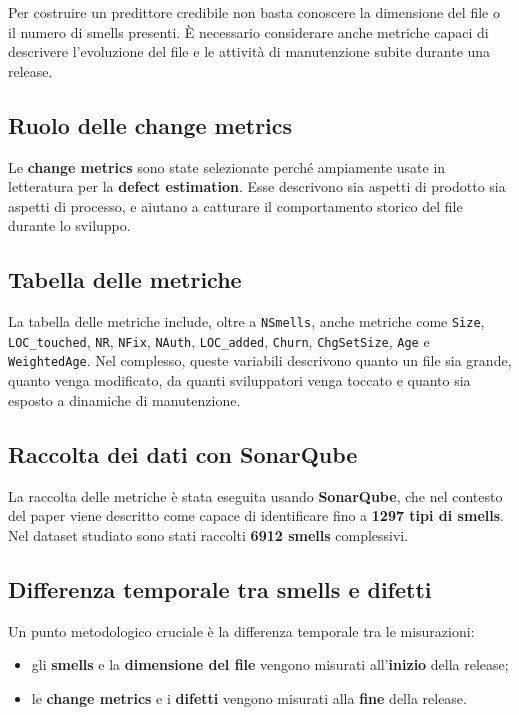 Per costruire un predittore credibile non basta conoscere la dimensione del file o il numero di smells presenti. È necessario considerare anche metriche capaci di descrivere l'evoluzione del file e le attività di manutenzione subite durante una release.

\subsection{Ruolo delle change metrics}

Le \textbf{change metrics} sono state selezionate perché ampiamente usate in letteratura per la \textbf{defect estimation}. Esse descrivono sia aspetti di prodotto sia aspetti di processo, e aiutano a catturare il comportamento storico del file durante lo sviluppo.

\subsection{Tabella delle metriche}

\begin{notaslide}
La tabella delle metriche include, oltre a \texttt{NSmells}, anche metriche come \texttt{Size}, \texttt{LOC\_touched}, \texttt{NR}, \texttt{NFix}, \texttt{NAuth}, \texttt{LOC\_added}, \texttt{Churn}, \texttt{ChgSetSize}, \texttt{Age} e \texttt{WeightedAge}. Nel complesso, queste variabili descrivono quanto un file sia grande, quanto venga modificato, da quanti sviluppatori venga toccato e quanto sia esposto a dinamiche di manutenzione.
\end{notaslide}

\subsection{Raccolta dei dati con SonarQube}

La raccolta delle metriche è stata eseguita usando \textbf{SonarQube}, che nel contesto del paper viene descritto come capace di identificare fino a \textbf{1297 tipi di smells}. Nel dataset studiato sono stati raccolti \textbf{6912 smells} complessivi.

\subsection{Differenza temporale tra smells e difetti}

Un punto metodologico cruciale è la differenza temporale tra le misurazioni:

\begin{itemize}
    \item gli \textbf{smells} e la \textbf{dimensione del file} vengono misurati all'\textbf{inizio} della release;
    \item le \textbf{change metrics} e i \textbf{difetti} vengono misurati alla \textbf{fine} della release.
\end{itemize}


